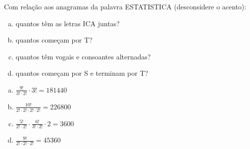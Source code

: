 \begin{ex}
Com relação aos anagramas da palavra ESTATISTICA (desconsidere o acento):
   \begin{enumerate}[(a)]
   \item quantos têm as letras ICA juntas?
   \item quantos começam por T?
   \item quantos têm vogais e consoantes alternadas?
   \item quantos começam por S e terminam por T?
   \end{enumerate}
     \begin{sol}
       \phantom{A} 
         \begin{enumerate} [(a)]
             \item $\frac{9!}{3!\cdot2!}\cdot3!=181440$
             \item $\frac{10!}{2!\cdot2!\cdot2!\cdot2!}=226800$
             \item $\frac{5!}{2!\cdot2!}\cdot\frac{6!}{3!\cdot2!}\cdot2=3600$
             \item $\frac{9!}{2!\cdot2!\cdot2!}=45360$
         \end{enumerate}
     \end{sol}
\end{ex}